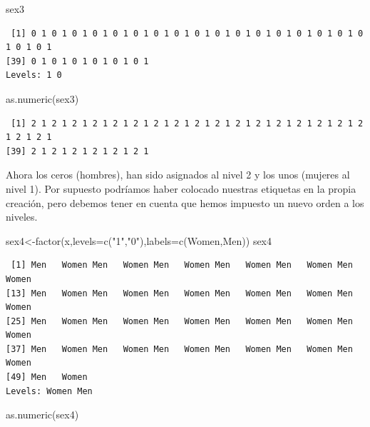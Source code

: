 \documentclass[
  letterpaper,
  DIV=11,
  numbers=noendperiod]{scrreprt}
\newenvironment{Shaded}{\begin{snugshade}}{\end{snugshade}}
\newcommand{\AttributeTok}[1]{\textcolor[rgb]{0.40,0.45,0.13}{#1}}
\newcommand{\FunctionTok}[1]{\textcolor[rgb]{0.28,0.35,0.67}{#1}}
\newcommand{\NormalTok}[1]{\textcolor[rgb]{0.00,0.23,0.31}{#1}}
\newcommand{\OtherTok}[1]{\textcolor[rgb]{0.00,0.23,0.31}{#1}}
\newcommand{\StringTok}[1]{\textcolor[rgb]{0.13,0.47,0.30}{#1}}
\begin{document}
\begin{Shaded}
\begin{Highlighting}[]
\NormalTok{sex3}
\end{Highlighting}
\end{Shaded}

\begin{verbatim}
 [1] 0 1 0 1 0 1 0 1 0 1 0 1 0 1 0 1 0 1 0 1 0 1 0 1 0 1 0 1 0 1 0 1 0 1 0 1 0 1
[39] 0 1 0 1 0 1 0 1 0 1 0 1
Levels: 1 0
\end{verbatim}

\begin{Shaded}
\begin{Highlighting}[]
\FunctionTok{as.numeric}\NormalTok{(sex3)}
\end{Highlighting}
\end{Shaded}

\begin{verbatim}
 [1] 2 1 2 1 2 1 2 1 2 1 2 1 2 1 2 1 2 1 2 1 2 1 2 1 2 1 2 1 2 1 2 1 2 1 2 1 2 1
[39] 2 1 2 1 2 1 2 1 2 1 2 1
\end{verbatim}

Ahora los ceros (hombres), han sido asignados al nivel 2 y los unos
(mujeres al nivel 1). Por supuesto podríamos haber colocado nuestras
etiquetas en la propia creación, pero debemos tener en cuenta que hemos
impuesto un nuevo orden a los niveles.

\begin{Shaded}
\begin{Highlighting}[]
\NormalTok{sex4}\OtherTok{\textless{}{-}}\FunctionTok{factor}\NormalTok{(x,}\AttributeTok{levels=}\FunctionTok{c}\NormalTok{(}\StringTok{"1"}\NormalTok{,}\StringTok{"0"}\NormalTok{),}\AttributeTok{labels=}\FunctionTok{c}\NormalTok{(}\StringTok{\textquotesingle{}Women\textquotesingle{}}\NormalTok{,}\StringTok{\textquotesingle{}Men\textquotesingle{}}\NormalTok{))}
\NormalTok{sex4}
\end{Highlighting}
\end{Shaded}

\begin{verbatim}
 [1] Men   Women Men   Women Men   Women Men   Women Men   Women Men   Women
[13] Men   Women Men   Women Men   Women Men   Women Men   Women Men   Women
[25] Men   Women Men   Women Men   Women Men   Women Men   Women Men   Women
[37] Men   Women Men   Women Men   Women Men   Women Men   Women Men   Women
[49] Men   Women
Levels: Women Men
\end{verbatim}

\begin{Shaded}
\begin{Highlighting}[]
\FunctionTok{as.numeric}\NormalTok{(sex4)}
\end{Highlighting}
\end{Shaded}
\end{document}
